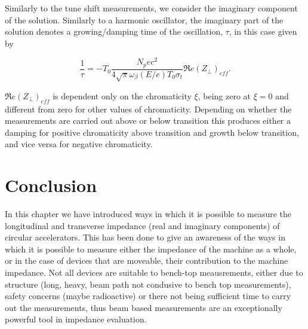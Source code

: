 Similarly to the tune shift measurements, we consider the imaginary component of the solution. Similarly to a harmonic oscillator, the imaginary part of the solution denotes a growing/damping time of the oscillation, $\tau$, in this case given by

\begin{equation}
\frac{1}{\tau} = -T_{0} \frac{N_{p}ec^{2}}{4\sqrt{\pi}\omega_{\beta} \left( E/e \right)T_{0}\sigma_{t}} \Re{}e\left(  Z_{\perp} \right)_{eff}.
\end{equation}

$\Re{}e\left(  Z_{\perp} \right)_{eff}$ is dependent only on the chromaticity $\xi$, being zero at $\xi = 0$ and different from zero for other values of chromaticity. Depending on whether the measurements are carried out above or below transition this produces either a damping for positive chromaticity above transition and growth below transition, and vice versa for negative chromaticity.

\section{Conclusion}

In this chapter we have introduced ways in which it is possible to measure the longitudinal and transverse impedance (real and imaginary components) of circular accelerators. This has been done to give an awareness of the ways in which it is possible to measure either the impedance of the machine as a whole, or in the case of devices that are moveable, their contribution to the machine impedance. Not all devices are suitable to bench-top meausrements, either due to structure (long, heavy, beam path not condusive to bench top measurements), safety concerns (maybe radioactive) or there not being sufficient time to carry out the measurements, thus beam based measurements are an exceptionally powerful tool in impedance evaluation.